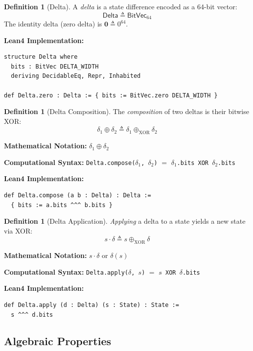 \documentclass[11pt,letterpaper]{article}
\theoremstyle{plain}
\theoremstyle{definition}
\newtheorem{definition}[theorem]{Definition}
\theoremstyle{remark}
\newcommand{\dcompose}{\oplus}           %
\newcommand{\dzero}{\mathbf{0}}          %
\newcommand{\DeltaType}{\mathsf{Delta}}
\newcommand{\BitVec}[1]{\mathsf{BitVec}_{#1}}
\begin{document}
\begin{definition}[Delta]
\label{def:delta}
A \emph{delta} is a state difference encoded as a 64-bit vector:
\[
\DeltaType \triangleq \BitVec{64}
\]
The identity delta (zero delta) is $\dzero \triangleq 0^{64}$.

\medskip
\noindent\textbf{Lean4 Implementation:}
\begin{lstlisting}
structure Delta where
  bits : BitVec DELTA_WIDTH
  deriving DecidableEq, Repr, Inhabited

def Delta.zero : Delta := { bits := BitVec.zero DELTA_WIDTH }
\end{lstlisting}
\end{definition}

\begin{definition}[Delta Composition]
\label{def:compose}
The \emph{composition} of two deltas is their bitwise XOR:
\[
\delta_1 \dcompose \delta_2 \triangleq \delta_1 \oplus_{\text{XOR}} \delta_2
\]

\medskip
\noindent\textbf{Mathematical Notation:} $\delta_1 \dcompose \delta_2$

\noindent\textbf{Computational Syntax:} \texttt{Delta.compose($\delta_1$, $\delta_2$)} $=$ \texttt{$\delta_1$.bits XOR $\delta_2$.bits}

\medskip
\noindent\textbf{Lean4 Implementation:}
\begin{lstlisting}
def Delta.compose (a b : Delta) : Delta :=
  { bits := a.bits ^^^ b.bits }
\end{lstlisting}
\end{definition}

\begin{definition}[Delta Application]
\label{def:apply}
\emph{Applying} a delta to a state yields a new state via XOR:
\[
s \cdot \delta \triangleq s \oplus_{\text{XOR}} \delta
\]

\medskip
\noindent\textbf{Mathematical Notation:} $s \cdot \delta$ or $\delta(s)$

\noindent\textbf{Computational Syntax:} \texttt{Delta.apply($\delta$, $s$)} $=$ \texttt{$s$ XOR $\delta$.bits}

\medskip
\noindent\textbf{Lean4 Implementation:}
\begin{lstlisting}
def Delta.apply (d : Delta) (s : State) : State :=
  s ^^^ d.bits
\end{lstlisting}
\end{definition}

\subsection{Algebraic Properties}
\end{document}
